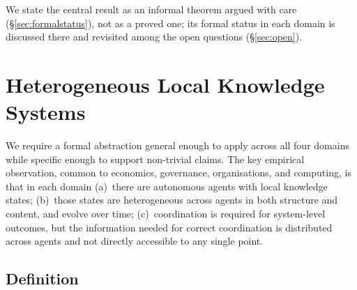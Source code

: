 \documentclass[11pt]{article}
\theoremstyle{definition}
\theoremstyle{plain}
\theoremstyle{plain}
\begin{document}
We state the central result as an informal theorem argued with care
(\S\ref{sec:formalstatus}), not as a proved one; its formal status in each domain is
discussed there and revisited among the open questions (\S\ref{sec:open}).

\section{Heterogeneous Local Knowledge Systems}
\label{sec:hlks}

We require a formal abstraction general enough to apply across all four
domains while specific enough to support non-trivial claims. The key empirical
observation, common to economics, governance, organisations, and computing, is
that in each domain (a)~there are autonomous agents with local knowledge
states; (b)~those states are heterogeneous across agents in both structure and
content, and evolve over time; (c)~coordination is required for system-level
outcomes, but the information needed for correct coordination is distributed
across agents and not directly accessible to any single point.

\subsection{Definition}
\end{document}
